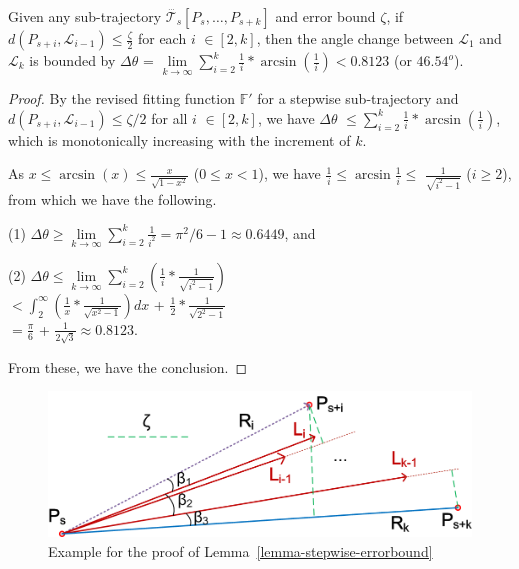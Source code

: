 \begin{llemma}
\label{lemma-stepwise-angle}
Given any sub-trajectory $\dddot{\mathcal{T}_s}[P_s, \ldots, P_{s+k}]$ and error bound $\zeta$,
if $d(P_{s+i}, \mathcal{L}_{i-1})\le \frac{\zeta}{2}$  for each $i$ $\in[2, k]$, then the angle change between $\mathcal{L}_{1}$ and $\mathcal{L}_{k}$ is bounded by $\Delta\theta$ = $\lim\limits_{k \to \infty }{\sum_{i=2}^k\frac{1}{i} * {\arcsin(\frac{1}{i})}} < 0.8123$ (or $46.54^o$).
\end{llemma}


\begin{proof}
By the revised fitting function $\mathbb{F'}$ for a stepwise sub-trajectory and $d(P_{s+i}, \mathcal{L}_{i-1})\le \zeta/2$ for all $i$ $\in[2, k]$,
we have $\Delta\theta$ $\le {\sum_{i=2}^{k}\frac{1}{i} * {\arcsin(\frac{1}{i})}}$, which is  monotonically increasing with the increment of $k$. %


As $x\le \arcsin(x) \le \frac{x}{\sqrt{1-x^2}}$ ($0\le x< 1$), we have $\frac{1}{i} \le \arcsin\frac{1}{i}\le$ $\frac{1}{\sqrt{i^2-1}}$ ($i\ge 2$), from which we have the following.

\sstab(1) $\Delta\theta\ge\lim\limits_{k \to \infty }{\sum_{i=2}^{k}\frac{1}{i^2}} = \pi^2/6 - 1 \approx 0.6449$, and

\sstab (2) $\Delta\theta \le \lim\limits_{k \to \infty }{\sum_{i=2}^{k}(\frac{1}{i}*\frac{1}{\sqrt{i^2-1}})}$\\

\hspace{8ex}$< {\int_{2}^{\infty}(\frac{1}{x}*\frac{1}{\sqrt{x^2-1}})}dx$ + $\frac{1}{2}*\frac{1}{\sqrt{2^2-1}}$\\

\hspace{8ex}$=\frac{\pi}{6}$ + $\frac{1}{2\sqrt{3}} \approx 0.8123$.

From these, we have the conclusion.
\end{proof}



\begin{figure}[tb!]
\centering
\includegraphics[scale = 0.68]{figures/Fig-MaxDistance.png}
\vspace{-2ex}
\caption{\small Example for the proof of Lemma~\ref{lemma-stepwise-errorbound}}
\label{fig:stepwise-maxdistance}
\vspace{-3ex}
\end{figure}



